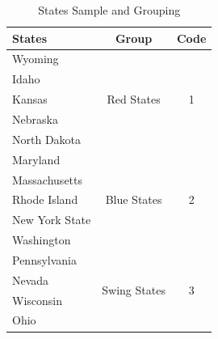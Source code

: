 \begin{table}[H]
    \centering
    \caption{States Sample and Grouping}
    \begin{tabular}{p{7.57em}cc}
        \toprule
        States         & \multicolumn{1}{p{7.93em}}{Group}                    & \multicolumn{1}{p{6.855em}}{Code} \\
        \midrule
        Wyoming        & \multicolumn{1}{c}{\multirow{5}[2]{*}{Red States}}   & \multirow{5}[2]{*}{1}             \\
        Idaho          &                                                      &                                   \\
        Kansas         &                                                      &                                   \\
        Nebraska       &                                                      &                                   \\
        North Dakota   &                                                      &                                   \\
        \midrule
        Maryland       & \multicolumn{1}{c}{\multirow{5}[2]{*}{Blue States}}  & \multirow{5}[2]{*}{2}             \\
        Massachusetts  &                                                      &                                   \\
        Rhode Island   &                                                      &                                   \\
        New York State &                                                      &                                   \\
        Washington     &                                                      &                                   \\
        \midrule
        Pennsylvania   & \multicolumn{1}{c}{\multirow{4}[2]{*}{Swing States}} & \multirow{4}[2]{*}{3}             \\
        Nevada         &                                                      &                                   \\
        Wisconsin      &                                                      &                                   \\
        Ohio           &                                                      &                                   \\
        \bottomrule
    \end{tabular}%
    \label{Table 2.3}%
\end{table}%

